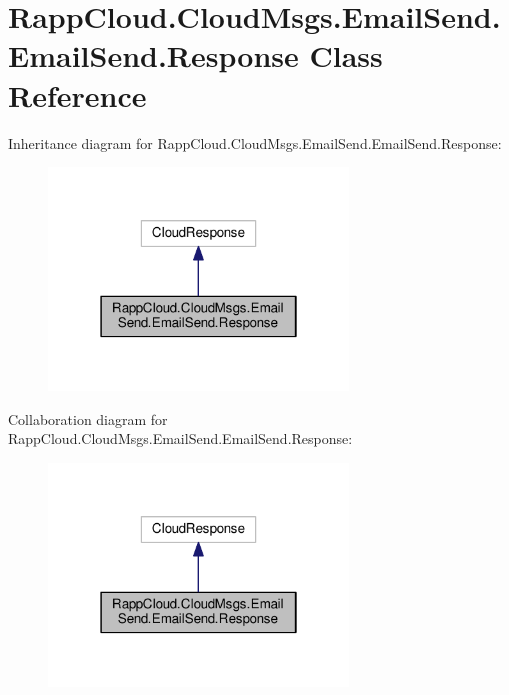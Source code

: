 \hypertarget{classRappCloud_1_1CloudMsgs_1_1EmailSend_1_1EmailSend_1_1Response}{\section{Rapp\-Cloud.\-Cloud\-Msgs.\-Email\-Send.\-Email\-Send.\-Response Class Reference}
\label{classRappCloud_1_1CloudMsgs_1_1EmailSend_1_1EmailSend_1_1Response}
}


Inheritance diagram for Rapp\-Cloud.\-Cloud\-Msgs.\-Email\-Send.\-Email\-Send.\-Response\-:
\nopagebreak
\begin{figure}[H]
\begin{center}
\leavevmode
\includegraphics[width=226pt]{classRappCloud_1_1CloudMsgs_1_1EmailSend_1_1EmailSend_1_1Response__inherit__graph}
\end{center}
\end{figure}


Collaboration diagram for Rapp\-Cloud.\-Cloud\-Msgs.\-Email\-Send.\-Email\-Send.\-Response\-:
\nopagebreak
\begin{figure}[H]
\begin{center}
\leavevmode
\includegraphics[width=226pt]{classRappCloud_1_1CloudMsgs_1_1EmailSend_1_1EmailSend_1_1Response__coll__graph}
\end{center}
\end{figure}

